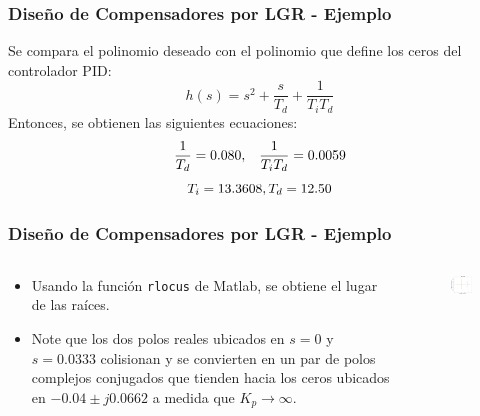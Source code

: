 \documentclass[aspectratio=169,handout]{beamer}
\theoremstyle{definition}
\theoremstyle{plain}
\theoremstyle{remark}
\begin{document}
\begin{frame}[c]\frametitle{Diseño de Compensadores por LGR - Ejemplo}
	Se compara el polinomio deseado con el polinomio que define los ceros del controlador PID:
	\begin{equation*}
		h(s) = s^2 + \frac{s}{T_d} + \frac{1}{T_i T_d}		
	\end{equation*}
	Entonces, se obtienen las siguientes ecuaciones:
	\begin{equation*}
		\frac{1}{T_d} = 0.080, \hspace*{3mm} \frac{1}{T_i T_d} = 0.0059
	\end{equation*}
	\begin{equation*}
		T_i = 13.3608, \vspace*{3mm} T_d = 12.50
	\end{equation*}
\end{frame}

\begin{frame}[c]\frametitle{Diseño de Compensadores por LGR - Ejemplo}
\begin{columns}
	\begin{column}{0.5\textwidth}
	\begin{itemize}
		\item Usando la función \texttt{rlocus} de Matlab, se obtiene el lugar de las raíces.
		\item Note que los dos polos reales ubicados en $s = 0$ y $s = 0.0333$ colisionan y se convierten en un par de polos complejos conjugados que tienden hacia los ceros ubicados en $-0.04 \pm j0.0662$ a medida que $K_p \rightarrow \infty$.
	\end{itemize}
	\end{column}
	\begin{column}{0.5\textwidth}
	\begin{figure}
		\includegraphics[width=7cm]{images/LGR_example.eps}
	\end{figure}
	\end{column}
\end{columns}
\end{frame}
\end{document}
